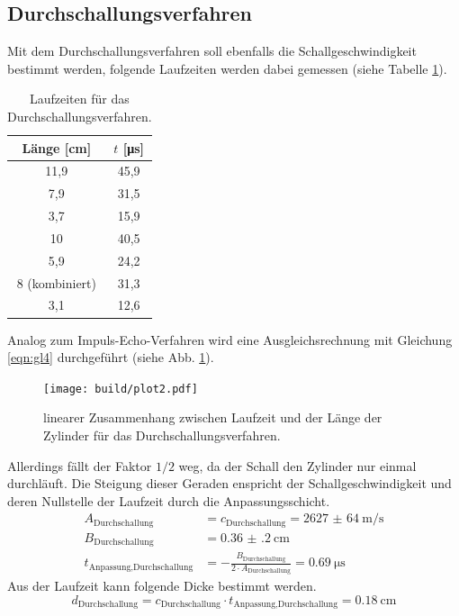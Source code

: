 \subsection{Durchschallungsverfahren}

Mit dem Durchschallungsverfahren soll ebenfalls die Schallgeschwindigkeit bestimmt werden, folgende Laufzeiten werden dabei gemessen (siehe Tabelle \ref{tab:Durch}).
\begin{table}
  \centering
  \caption{Laufzeiten für das Durchschallungsverfahren.}
  \label{tab:Durch}
  \begin{tabular}{c c}
    \toprule
    Länge [\si{\centi\meter}] & $t$ [\si{\micro\second}] \\
    \midrule
    11,9  & 45,9 \\
     7,9  & 31,5 \\
     3,7  & 15,9 \\
      10  & 40,5 \\
     5,9  & 24,2 \\
       8 (kombiniert) & 31,3 \\
     3,1  & 12,6 \\
    \bottomrule
  \end{tabular}
\end{table}
Analog zum Impuls-Echo-Verfahren wird eine Ausgleichsrechnung mit Gleichung \eqref{eqn:gl4} durchgeführt (siehe Abb. \ref{fig:plot2}).
\begin{figure}
  \texttt{[image: build/plot2.pdf]}
  \caption{linearer Zusammenhang zwischen Laufzeit und der Länge der Zylinder für das Durchschallungsverfahren.}
  \label{fig:plot2}
\end{figure}
Allerdings fällt der Faktor $1/2$ weg, da der Schall den Zylinder nur einmal durchläuft.
Die Steigung dieser Geraden enspricht der Schallgeschwindigkeit und deren Nullstelle der Laufzeit durch die Anpassungsschicht.
\begin{align*}
  A_\text{Durchschallung} &= c_\text{Durchschallung} = \SI{2627(64)}{\meter\per\second} \\
  B_\text{Durchschallung} &= \SI{0.36(20)}{\centi\meter} \\
  t_\text{Anpassung,Durchschallung} &= - \frac{B_\text{Durchschallung}}{2 \cdot A_\text{Durchschallung}} =\SI{0.69}{\micro\second}
\end{align*}
Aus der Laufzeit kann folgende Dicke bestimmt werden.
\begin{equation*}
d_\text{Durchschallung} = c_\text{Durchschallung} \cdot t_\text{Anpassung,Durchschallung} = \SI{0.18}{\centi\meter}
\end{equation*}

